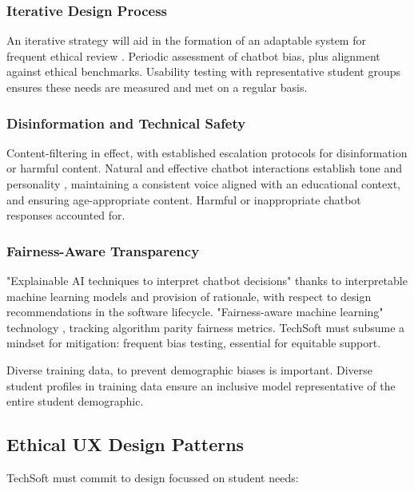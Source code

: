 \documentclass[14pt,a4paper]{article}
\begin{document}
\begin{multicols}{2}
\subsubsection{Iterative Design Process}
An iterative strategy \textit{\parencite[pp. 30-60]{HoltzblattBeyer2024}} will aid in the formation of an adaptable system for frequent ethical review \textit{\parencite{FloridiCowls2024}}.
Periodic assessment of chatbot bias, plus alignment against ethical benchmarks.
Usability testing with representative student groups ensures these needs are measured and met on a regular basis.

\subsubsection{Disinformation and Technical Safety}
Content-filtering in effect, with established escalation protocols for disinformation or harmful content.
Natural and effective chatbot interactions establish tone and personality \textit{\parencite[pp. 20-50]{Bradbury2024}}, maintaining a consistent voice aligned with an educational context, and ensuring age-appropriate content.
Harmful or inappropriate chatbot responses \textit{\parencite[p. e11510]{Bickmore2021}} accounted for.

\subsubsection{Fairness-Aware Transparency}
 "Explainable AI techniques to interpret chatbot decisions" \textit{\parencite[pp. 82-115]{Arrieta2022}} thanks to interpretable machine learning models and provision of rationale, with respect to design recommendations in the software lifecycle.
"Fairness-aware machine learning" technology \textit{\parencite{Barocas2021}}, tracking algorithm parity fairness metrics.
    TechSoft must subsume a mindset for mitigation: frequent bias testing, essential for equitable support.

Diverse training data, to prevent demographic biases \textit{\parencite[pp. 1-35]{Mehrabi2024}} is important.
Diverse student profiles in training data ensure an inclusive model representative of the entire student demographic.


\subsection{Ethical UX Design Patterns}
TechSoft must commit to design focussed on student needs:


\end{multicols}
\end{document}

